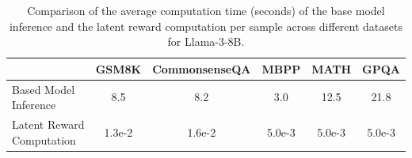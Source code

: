 \begin{table}[t]
\centering
\newcommand{\newscriptspacesmall}{\makebox[\widthof{e-}]{}}
\newcommand{\newscriptspace}{\makebox[\widthof{e-0}]{}}
\newcommand{\newscriptspacebig}{\makebox[\widthof{e-00}]{}} 
\small
\caption{Comparison of the average computation time (seconds) of the base model inference and the latent reward computation per sample across different datasets for Llama-3-8B.}
\begin{tabular}{lccccc}
\toprule
                       & 
        \textbf{GSM8K}& \textbf{CommonsenseQA}  & \textbf{MBPP} & \textbf{MATH} & \textbf{GPQA}
\\ \midrule 
Based Model Inference&8.5&8.2&3.0&12.5&21.8\\
Latent Reward Computation&1.3e-2\newscriptspace&1.6e-2\newscriptspace&5.0e-3\newscriptspace&5.0e-3\newscriptspacesmall&5.0e-3\newscriptspacesmall
\\
\bottomrule
\end{tabular}
\label{tab:sampling_efficiency_analysis_llama3}
\end{table}
